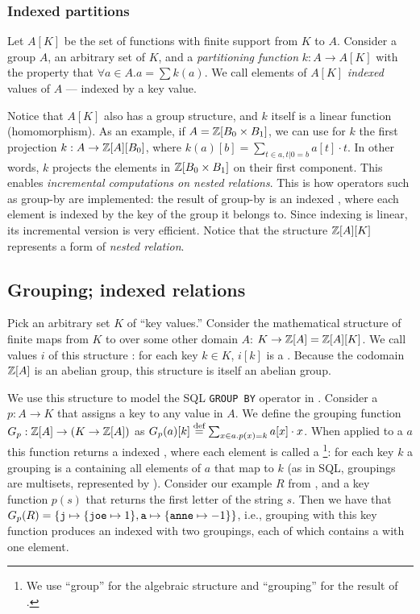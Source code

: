 \subsubsection{Indexed partitions}

Let $A[K]$ be the set of functions with finite support from $K$ to $A$.
Consider a group $A$, an arbitrary set of  $K$, and a
\emph{partitioning function} $k: A \to A[K]$ with the property that
$\forall a \in A . a = \sum k(a)$.  We call elements of $A[K]$ \emph{indexed}
values of $A$ --- indexed by a key value.

Notice that $A[K]$ also has a group structure, and $k$ itself
is a linear function (homomorphism).  As an example,
if $A = \mathbb{Z}[B_0 \times B_1]$, we can use for $k$ the first projection
$k: A \to \mathbb{Z}[A][B_0]$, where $k(a)[b] = \sum_{t \in a, t|0 = b} a[t] \cdot t$.
In other words, $k$ projects the elements in $\mathbb{Z}[B_0 \times B_1]$ on
their first component.  This enables \emph{incremental computations
on nested relations}.  This is how operators such as group-by are
implemented: the result of group-by is an indexed \zr, where each
element is indexed by the key of the group it belongs to.  Since
indexing is linear, its incremental version is very efficient.
Notice that the structure $\mathbb{Z}[A][K]$ represents a form of \emph{nested relation}.

\subsection{Grouping; indexed relations}\label{sec:grouping}

Pick an arbitrary set $K$ of ``key values.''
Consider the mathematical structure of finite maps from $K$
to \zrs over some other domain $A$: $K \to \mathbb{Z}[A] = \mathbb{Z}[A][K]$.
We call values $i$ of this structure : for
each key $k \in K$, $i[k]$ is a \zr.  Because
the codomain $\mathbb{Z}[A]$ is an abelian group, this structure is itself
an abelian group.

We use this structure to model the SQL \texttt{GROUP BY} operator in \dbsp.
Consider a 
$p: A \to K$ that assigns a key to any value in $A$.  We define the grouping function
$G_p: \mathbb{Z}[A] \to (K \to \mathbb{Z}[A])$ as $G_p(a)[k] \stackrel{\textrm{\scriptsize def}}{=} \sum_{x \in a.p(x)=k}a[x] \cdot x$.
When applied to a \zr $a$ this function returns a indexed \zr, where each element
is called a \footnote{We use
``group'' for the algebraic structure and ``grouping'' for the result of .}: for each key $k$ a
grouping is a \zr containing all elements of $a$ that map to $k$
(as in SQL, groupings are multisets, represented by \zrs).
Consider our example \zr $R$ from ,
and a key function $p(s)$ that returns the first letter of the string
$s$. Then we have that $G_p(R) = \{ \mbox{\texttt{j}} \mapsto \{ \mbox{\texttt{joe}}
\mapsto 1 \}, \mbox{\texttt{a}} \mapsto \{ \mbox{\texttt{anne}} \mapsto -1 \} \}$,
i.e., grouping with this key function produces an indexed \zr with two groupings, each
of which contains a \zr with one element.

